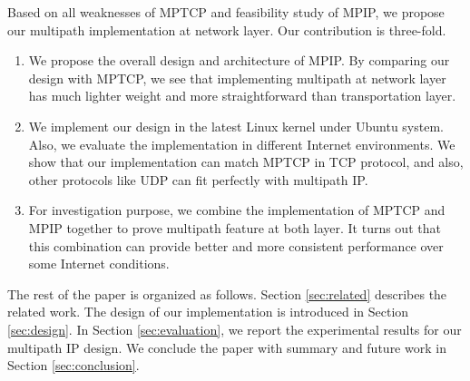 Based on all weaknesses of MPTCP and feasibility study of MPIP, we propose our multipath implementation at network layer. Our contribution is three-fold.
\begin{enumerate}
\item We propose the overall design and architecture of MPIP. By comparing our design with MPTCP, we see that implementing multipath at network layer has much lighter weight and more straightforward than transportation layer.

\item We implement our design in the latest Linux kernel under Ubuntu system. Also, we evaluate the implementation in different Internet environments. We show that our implementation can match MPTCP in TCP protocol, and also, other protocols like UDP can fit perfectly with multipath IP.

\item For investigation purpose, we combine the implementation of MPTCP and MPIP together to prove multipath feature at both layer. It turns out that this combination can provide better and more consistent performance over some Internet conditions.
\end{enumerate}

The rest of the paper is organized as follows. Section \ref{sec:related} describes the related work.
The design of our implementation is introduced in Section \ref{sec:design}. In Section \ref{sec:evaluation}, we report the experimental results for our multipath IP design. We conclude the paper with summary and future work in Section \ref{sec:conclusion}.
